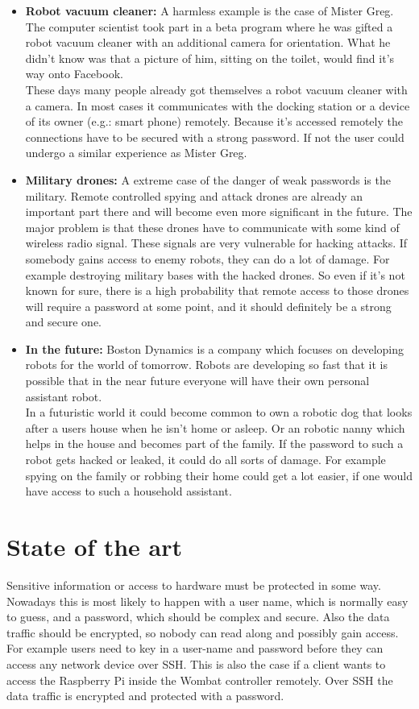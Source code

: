 \documentclass[conference]{IEEEtran}
\begin{document}
\begin{itemize}
\item \textbf{Robot vacuum cleaner:} A harmless example is the case of Mister Greg. The computer scientist took part in a beta program where he was gifted a robot vacuum cleaner with an additional camera for orientation. What he didn't know was that a picture of him, sitting on the toilet, would find it's way onto Facebook. \cite{b10}\\
These days many people already got themselves a robot vacuum cleaner with a camera. In most cases it communicates with the docking station or a device of its owner (e.g.: smart phone) remotely. Because it's accessed remotely the connections have to be secured with a strong password. If not the user could undergo a similar experience as Mister Greg. 
\item \textbf{Military drones:} A extreme case of the danger of weak passwords is the military. Remote controlled spying and attack drones are already an important part there and will become even more significant in the future. The major problem is that these drones have to communicate with some kind of wireless radio signal. These signals are very vulnerable for hacking attacks. If somebody gains access to enemy robots, they can do a lot of damage. For example destroying military bases with the hacked drones. So even if it's not known for sure, there is a high probability that remote access to those drones will require a password at some point, and it should definitely be a strong and secure one.
\item \textbf{In the future:} Boston Dynamics is a company which focuses on developing robots for the world of tomorrow. Robots are developing so fast that it is possible that in the near future everyone will have their own personal assistant robot. \cite{b12}\\
In a futuristic world it could become common to own a robotic dog that looks after a users house when he isn't home or asleep. Or an robotic nanny which helps in the house and becomes part of the family. If the password to such a robot gets hacked or leaked, it could do all sorts of damage. For example spying on the family or robbing their home could get a lot easier, if one would have access to such a household assistant.
\end{itemize}

\section{State of the art}
Sensitive information or access to hardware must be protected in some way. Nowadays this is most likely to happen with a user name, which is normally easy to guess, and a password, which should be complex and secure. Also the data traffic should be encrypted, so nobody can read along and possibly gain access.\\
For example users need to key in a user-name and password before they can access any network device over SSH. This is also the case if a client wants to access the Raspberry Pi inside the Wombat controller remotely. Over SSH the data traffic is encrypted and protected with a password.
\end{document}
